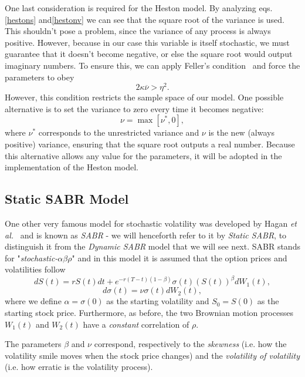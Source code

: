 One last consideration is required for the Heston model.
By analyzing eqs.\eqref{hestons} and\eqref{hestonv} we can see that the square root of the variance is used. This shouldn't pose a problem, since the variance of any process is always positive. However, because in our case this variable is itself stochastic, we must guarantee that it doesn't become negative, or else the square root would output imaginary numbers. To ensure this, we can apply Feller's condition~\citep{feller} and force the parameters to obey
\begin{equation}
2\kappa\overline{\nu}>\eta^2.
\end{equation}
\noindent However, this condition restricts the sample space of our model. One possible alternative is to set the variance to zero every time it becomes negative:
\begin{equation}
\nu=\max\left[\nu^*,0\right],
\end{equation}
\noindent where $\nu^*$ corresponds to the unrestricted variance and $\nu$ is the new (always positive) variance, ensuring that the square root outputs a real number. Because this alternative allows any value for the parameters, it will be adopted in the implementation of the Heston model.


\subsection{Static SABR Model}
One other very famous model for stochastic volatility was developed by Hagan \textit{et al.}~\citep{Hagan} and is known as \emph{SABR} - we will henceforth refer to it by \emph{Static SABR}, to distinguish it from the \emph{Dynamic SABR} model that we will see next. SABR stands for "\emph{stochastic-}$\alpha\beta\rho$" and in this model it is assumed that the option prices and volatilities follow~\citep{Geeske}
\begin{equation}\label{dF}
\boxed{dS(t)=rS(t)dt+e^{-r(T-t)(1-\beta)}\sigma(t)(S(t))^\beta dW_1(t),}
\end{equation}
\begin{equation}\label{dsigma}
\boxed{d\sigma(t)=\nu\sigma(t) dW_2(t),}
\end{equation}
\noindent where we define $\alpha=\sigma(0)$ as the starting volatility and $S_0=S(0)$ as the starting stock price. Furthermore, as before, the two Brownian motion processes $W_1(t)$ and $W_2(t)$ have a \emph{constant} correlation of $\rho$.

The parameters $\beta$ and $\nu$ correspond, respectively to the \emph{skewness} (i.e. how the volatility smile moves when the stock price changes) and the \emph{volatility of volatility} (i.e. how erratic is the volatility process).



